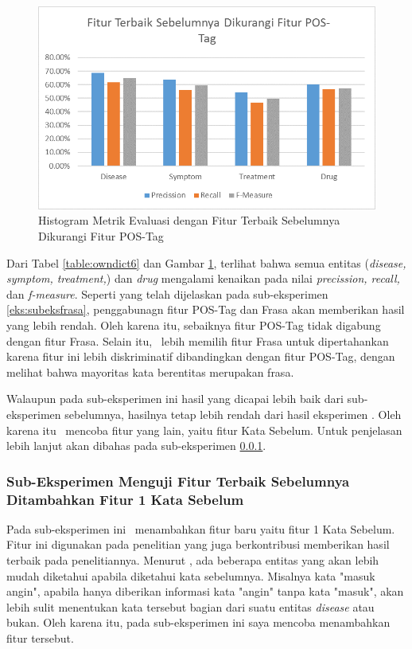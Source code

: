 	\begin{figure}
		\centering
		\includegraphics[width=\linewidth]{images/histogram6}
		\caption{Histogram Metrik Evaluasi dengan Fitur Terbaik Sebelumnya Dikurangi Fitur POS-Tag}
		\label{fig:owndict6}
	\end{figure}
	
	Dari Tabel \ref{table:owndict6} dan Gambar \ref{fig:owndict6}, terlihat bahwa semua entitas (\textit{disease, symptom, treatment,}) dan \textit{drug} mengalami kenaikan pada nilai \textit{precission, recall,} dan \textit{f-measure}. Seperti yang telah dijelaskan pada sub-eksperimen \ref{eks:subeksfrasa}, penggabunagn fitur POS-Tag dan Frasa akan memberikan hasil yang lebih rendah. Oleh karena itu, sebaiknya fitur POS-Tag tidak digabung dengan fitur Frasa. Selain itu, \saya~lebih memilih fitur Frasa untuk dipertahankan karena fitur ini lebih diskriminatif dibandingkan dengan fitur POS-Tag, dengan melihat bahwa mayoritas kata berentitas merupakan frasa.
	
	Walaupun pada sub-eksperimen ini hasil yang dicapai lebih baik dari sub-eksperimen sebelumnya, hasilnya tetap lebih rendah dari hasil eksperimen \cite{skripsiKakRadit}. Oleh karena itu \saya~mencoba fitur yang lain, yaitu fitur Kata Sebelum. Untuk penjelasan lebih lanjut akan dibahas pada sub-eksperimen \ref{eks:subekswbef1}.
	
	\subsubsection{Sub-Eksperimen Menguji Fitur Terbaik Sebelumnya Ditambahkan Fitur 1 Kata Sebelum}\label{eks:subekswbef1}
	Pada sub-eksperimen ini \saya~menambahkan fitur baru yaitu fitur 1 Kata Sebelum. Fitur ini digunakan pada penelitian \cite{skripsiKakRadit} yang juga berkontribusi memberikan hasil terbaik pada penelitiannya. Menurut \saya, ada beberapa entitas yang akan lebih mudah diketahui apabila diketahui kata sebelumnya. Misalnya kata "masuk angin", apabila hanya diberikan informasi kata "angin" tanpa kata "masuk", akan lebih sulit menentukan kata tersebut bagian dari suatu entitas \textit{disease} atau bukan. Oleh karena itu, pada sub-eksperimen ini saya mencoba menambahkan fitur tersebut.
	
